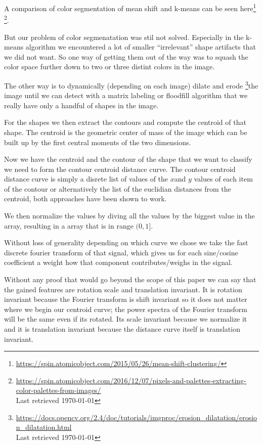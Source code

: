 \documentclass[journal]{vgtc}       %
\begin{document}
A comparison of color segmentation of mean shift and  k-means can be seen here\footnote{\url{https://spin.atomicobject.com/2015/05/26/mean-shift-clustering/}} 
\footnote{\url{https://spin.atomicobject.com/2016/12/07/pixels-and-palettes-extracting-color-palettes-from-images/} \\ Last retrieved \today}. 


But our problem of color segmenatation was stil not solved. Especially in the k-means algorithm we encountered a lot of smaller ``irrelevant'' shape artifacts that we did not want.
So one way of getting them out of the way was to squash the color space further down to two or three distint colors in the image.

The other way is to  dynamically (depending on each image) dilate and erode \footnote{\url{https://docs.opencv.org/2.4/doc/tutorials/imgproc/erosion_dilatation/erosion_dilatation.html}\\ Last retrieved \today}the image until we can detect with a matrix labeling  or   floodfill algorithm that we really have only a handful of shapes in the image.

For the shapes we then extract the contours and compute the centroid of that shape.
The centroid is the geometric center of mass of the image which can be built up by the first central moments of the two dimensions.

Now we have the centroid and the contour of the shape that we want to classify we need to form the contour centroid distance curve.
The contour centroid distance curve is simply a disrete list of values of the \(x\)and \(y\)  values of each item of the contour  or alternatively the list of the euclidian  distances from the centroid, both approaches have been shown to work.

We then normalize the values by diving all the values by the biggest value in the array, resulting in a array that is in range $(0,1]$.

Without loss of generality depending on which curve we chose we take the fast discrete fourier transform of that signal, which gives us for each sine/cosine coefficient a weight how that component contributes/weighs in the signal.

Without any proof that would go beyond the scope of this paper we can say that the gained features are rotation scale and translation invariant. It is rotation invariant because the Fourier transform is shift invariant so it does not matter where we begin our centroid curve; the power spectra of the Fourier transform will be the same even if its rotated. Its scale invariant because we normalize it and it is translation invariant because the distance curve itself is  translation invariant.
\end{document}
